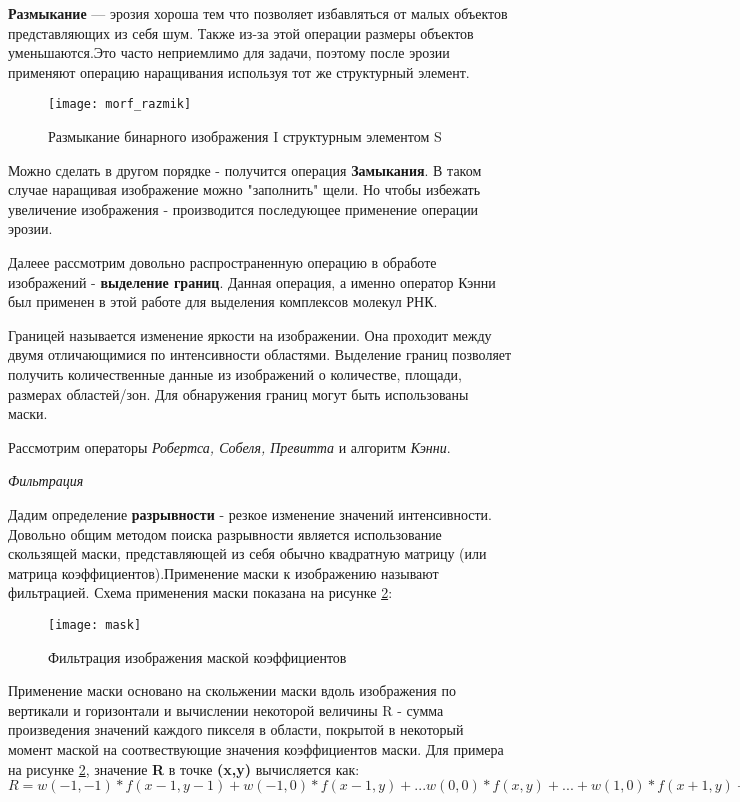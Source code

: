 	\textbf{Размыкание} — эрозия хороша тем что позволяет избавляться от малых объектов представляющих из себя шум. Также из-за этой операции размеры объектов уменьшаются.Это часто неприемлимо для задачи, поэтому после эрозии применяют операцию наращивания используя тот же структурный элемент.\cite{Manual}
	\begin{figure}[H]
		\centering
		\texttt{[image: morf\_razmik]}
		\caption{Размыкание бинарного изображения I структурным элементом S}
		\label{morf_razmik}
	\end{figure}

Можно сделать в другом порядке - получится операция \textbf{Замыкания}. В таком случае наращивая изображение можно "заполнить" щели. Но чтобы избежать увеличение изображения - производится последующее применение операции эрозии. \cite{Manual}




Далеее рассмотрим довольно распространенную операцию в обработе изображений - \textbf{выделение границ}. Данная операция, а именно оператор Кэнни был применен в этой работе для выделения комплексов молекул РНК.

Границей называется изменение яркости на изображении. Она проходит между двумя отличающимися по интенсивности областями. Выделение границ позволяет получить количественные данные из изображений о количестве, площади, размерах областей/зон. Для обнаружения границ могут быть использованы маски.\cite{Misc}


Рассмотрим операторы \textit{Робертса, Собеля, Превитта} и алгоритм \textit{Кэнни}.

\begin{center}
	\textit{Фильтрация}
\end{center}
 Дадим определение \textbf{разрывности} - резкое изменение значений интенсивности. Довольно общим методом поиска разрывности является использование скользящей маски, представляющей из себя обычно квадратную матрицу (или матрица коэффициентов).Применение маски к изображению называют фильтрацией.\cite{Phdthesis}
	Схема  применения маски показана на рисунке \ref{mask}:
	\begin{figure}[H]
		\centering
		\texttt{[image: mask]}
		\caption{Фильтрация изображения маской коэффициентов}
		\label{mask}
\end{figure}

Применение маски основано на скольжении маски вдоль изображения по вертикали и горизонтали и вычислении некоторой величины R - сумма произведения значений каждого пикселя в области, покрытой в некоторый момент маской на соотвествующие значения коэффициентов маски.\cite{Phdthesis}
Для примера на рисунке \ref{mask}, значение \textbf{R}  в точке \textbf{(x,y)} вычисляется как:
$R = w(-1, -1) * f(x - 1, y - 1) + w(-1, 0) * f(x - 1, y) + ...w(0,0) * f(x, y) + ... + w(1, 0) * f(x + 1, y) + w(1,1) * f(x + 1, y + 1)$ 

